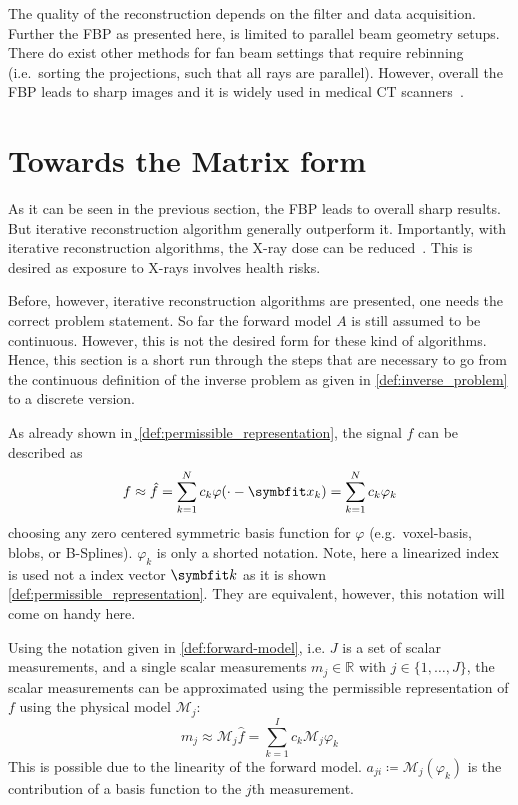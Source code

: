 The quality of the reconstruction depends on the filter and data acquisition. Further the FBP as
presented here, is limited to parallel beam geometry setups. There do exist other methods for fan
beam settings that require rebinning (i.e.\ sorting the projections, such that all rays are
parallel). However, overall the FBP leads to sharp images and it is widely used in medical CT
scanners~\cite{pan_why_2009}.


\section{Towards the Matrix form}\label{sec:matrix_formulation}

As it can be seen in the previous section, the \gls{FBP} leads to overall sharp results. But
iterative reconstruction algorithm generally outperform it. Importantly, with iterative
reconstruction algorithms, the X-ray dose can be reduced~\cite{willemink_evolution_2019}. This is
desired as exposure to X-rays involves health risks.

Before, however, iterative reconstruction algorithms are presented, one needs the correct problem
statement. So far the forward model \(A\) is still assumed to be continuous. However, this is not
the desired form for these kind of algorithms. Hence, this section is a short run through the steps
that are necessary to go from the continuous definition of the inverse problem as given in
\autoref{def:inverse_problem} to a discrete version.

As already shown in¸\autoref{def:permissible_representation}, the signal \(f\) can be described as
\begin{equation}
	f \approx \near{f} = \sum_{k=1}^{N} c_k \varphi(\cdot - \mvec{x}_k) = \sum_{k=1}^{N} c_k \varphi_k
\end{equation}
choosing any zero centered symmetric basis function for \(\varphi\) (e.g.\ voxel-basis, blobs, or
B-Splines). \(\varphi_k\) is only a shorted notation. Note, here a linearized index is used not a
index vector \(\mvec{k}\) as it is shown \autoref{def:permissible_representation}. They are
equivalent, however, this notation will come on handy here.

Using the notation given in \autoref{def:forward-model}, i.e. \(J\) is a set of scalar measurements,
and a single scalar measurements \(m_j \in \mathbb{R}\) with \(j \in \lbrace 1, \dots, J \rbrace\),
the scalar measurements can be approximated using the permissible representation of \(f\) using the
physical model \(\mathscr{M}_j\):
\begin{equation}
	m_j \approx \mathscr{M}_j\hat{f} = \sum_{k=1}^{I} c_k \mathscr{M}_j\varphi_k
\end{equation}
This is possible due to the linearity of the forward model. \(a_{ji} \coloneq
\mathscr{M}_j(\varphi_k)\) is the contribution of a basis function to the \(j\)th measurement.


